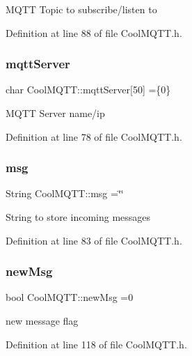 M\+Q\+TT Topic to subscribe/listen to 

Definition at line 88 of file Cool\+M\+Q\+T\+T.\+h.

\mbox{\label{class_cool_m_q_t_t_ab8bb951f87ddbf92db74c2ad16a3e53e}} 
\subsubsection{\texorpdfstring{mqtt\+Server}{mqttServer}}
{\footnotesize\ttfamily char Cool\+M\+Q\+T\+T\+::mqtt\+Server\mbox{[}50\mbox{]} =\{\textquotesingle{}0\textquotesingle{}\}\hspace{0.3cm}{\ttfamily [private]}}

M\+Q\+TT Server name/ip 

Definition at line 78 of file Cool\+M\+Q\+T\+T.\+h.

\mbox{\label{class_cool_m_q_t_t_af6b19e7074dbbb4ae493c44dcb53f7ff}} 
\subsubsection{\texorpdfstring{msg}{msg}}
{\footnotesize\ttfamily String Cool\+M\+Q\+T\+T\+::msg =\char`\"{}\char`\"{}\hspace{0.3cm}{\ttfamily [private]}}

String to store incoming messages 

Definition at line 83 of file Cool\+M\+Q\+T\+T.\+h.

\mbox{\label{class_cool_m_q_t_t_a3240388137b885775aadf38e96b24c6b}} 
\subsubsection{\texorpdfstring{new\+Msg}{newMsg}}
{\footnotesize\ttfamily bool Cool\+M\+Q\+T\+T\+::new\+Msg =0\hspace{0.3cm}{\ttfamily [private]}}

new message flag 

Definition at line 118 of file Cool\+M\+Q\+T\+T.\+h.

